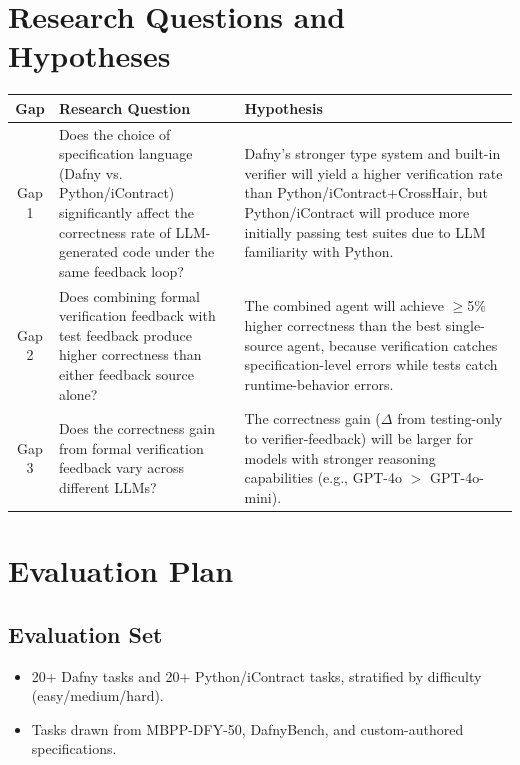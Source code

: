 \documentclass[11pt,a4paper]{article}
\begin{document}
\section{Research Questions and Hypotheses}

\begin{table}[H]
\centering
\small
\begin{tabularx}{\textwidth}{|c|X|X|}
\hline
\textbf{Gap} & \textbf{Research Question} & \textbf{Hypothesis} \\
\hline
Gap 1 & Does the choice of specification language (Dafny vs. Python/iContract) significantly affect the correctness rate of LLM-generated code under the same feedback loop? & Dafny's stronger type system and built-in verifier will yield a higher verification rate than Python/iContract+CrossHair, but Python/iContract will produce more initially passing test suites due to LLM familiarity with Python. \\
\hline
Gap 2 & Does combining formal verification feedback with test feedback produce higher correctness than either feedback source alone? & The combined agent will achieve $\geq$5\% higher correctness than the best single-source agent, because verification catches specification-level errors while tests catch runtime-behavior errors. \\
\hline
Gap 3 & Does the correctness gain from formal verification feedback vary across different LLMs? & The correctness gain ($\Delta$ from testing-only to verifier-feedback) will be larger for models with stronger reasoning capabilities (e.g., GPT-4o $>$ GPT-4o-mini). \\
\hline
\end{tabularx}
\end{table}

\section{Evaluation Plan}

\subsection{Evaluation Set}
\begin{itemize}[noitemsep]
    \item 20+ Dafny tasks and 20+ Python/iContract tasks, stratified by difficulty (easy/medium/hard).
    \item Tasks drawn from MBPP-DFY-50, DafnyBench, and custom-authored specifications.
\end{itemize}
\end{document}
